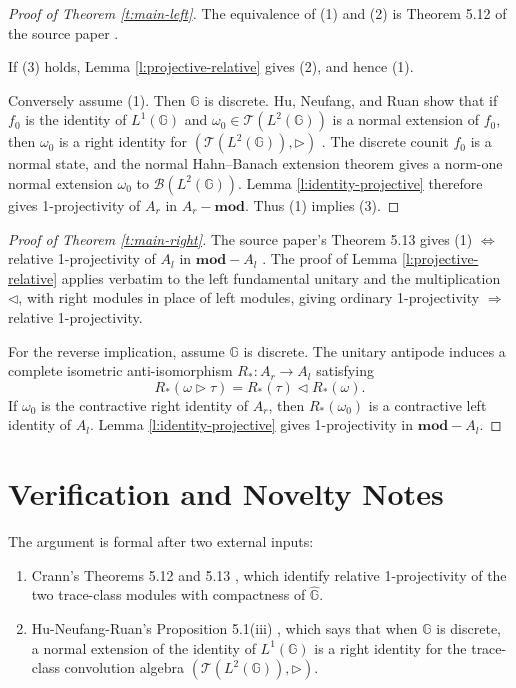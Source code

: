 \documentclass[11pt]{amsart}
\theoremstyle{remark}
\newcommand{\G}{\mathbb G}
\newcommand{\hG}{\widehat{\mathbb G}}
\newcommand{\TC}{\mathcal T}
\newcommand{\B}{\mathcal B}
\newcommand{\opmod}{\mathbf{mod}}
\newcommand{\rhdp}{\triangleright}
\newcommand{\lhdp}{\triangleleft}
\begin{document}
\begin{proof}[Proof of Theorem \ref{t:main-left}]
The equivalence of (1) and (2) is Theorem 5.12 of the source paper \cite[Theorem 5.12]{Crann2015}.

If (3) holds, Lemma \ref{l:projective-relative} gives (2), and hence (1).

Conversely assume (1).  Then \(\G\) is discrete.  Hu, Neufang, and Ruan show that if \(f_0\) is the identity of \(L^1(\G)\) and \(\omega_0\in\TC(L^2(\G))\) is a normal extension of \(f_0\), then \(\omega_0\) is a right identity for \((\TC(L^2(\G)),\rhdp)\) \cite[Proposition 5.1(iii)]{HNR2013}.  The discrete counit \(f_0\) is a normal state, and the normal Hahn--Banach extension theorem gives a norm-one normal extension \(\omega_0\) to \(\B(L^2(\G))\).  Lemma \ref{l:identity-projective} therefore gives 1-projectivity of \(A_r\) in \(A_r-\opmod\).  Thus (1) implies (3).
\end{proof}

\begin{proof}[Proof of Theorem \ref{t:main-right}]
The source paper's Theorem 5.13 gives (1) \(\Leftrightarrow\) relative 1-projectivity of \(A_l\) in \(\opmod-A_l\) \cite[Theorem 5.13]{Crann2015}.  The proof of Lemma \ref{l:projective-relative} applies verbatim to the left fundamental unitary and the multiplication \(\lhdp\), with right modules in place of left modules, giving ordinary 1-projectivity \(\Rightarrow\) relative 1-projectivity.

For the reverse implication, assume \(\G\) is discrete.  The unitary antipode induces a complete isometric anti-isomorphism \(R_*:A_r\to A_l\) satisfying
\[
 R_*(\omega\rhdp\tau)=R_*(\tau)\lhdp R_*(\omega).
\]
If \(\omega_0\) is the contractive right identity of \(A_r\), then \(R_*(\omega_0)\) is a contractive left identity of \(A_l\).  Lemma \ref{l:identity-projective} gives 1-projectivity in \(\opmod-A_l\).
\end{proof}

\section{Verification and Novelty Notes}

The argument is formal after two external inputs:
\begin{enumerate}
\item Crann's Theorems 5.12 and 5.13 \cite{Crann2015}, which identify relative 1-projectivity of the two trace-class modules with compactness of \(\hG\).
\item Hu-Neufang-Ruan's Proposition 5.1(iii) \cite{HNR2013}, which says that when \(\G\) is discrete, a normal extension of the identity of \(L^1(\G)\) is a right identity for the trace-class convolution algebra \((\TC(L^2(\G)),\rhdp)\).
\end{enumerate}
\end{document}
